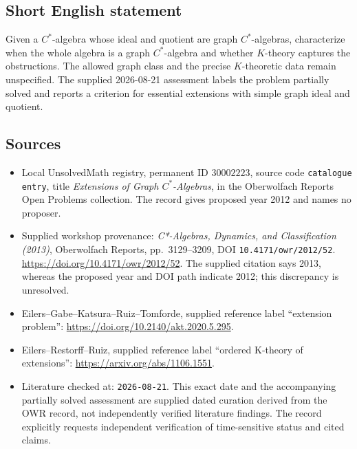 \documentclass[11pt]{article}
\begin{document}
\subsection{Short English statement}
Given a \(C^*\)-algebra whose ideal and quotient are graph \(C^*\)-algebras, characterize when the whole algebra is a graph \(C^*\)-algebra and whether \(K\)-theory captures the obstructions. The allowed graph class and the precise \(K\)-theoretic data remain unspecified. The supplied 2026-08-21 assessment labels the problem partially solved and reports a criterion for essential extensions with simple graph ideal and quotient.
\subsection{Sources}
\begin{itemize}
\item Local UnsolvedMath registry, permanent ID \(30002223\), source code \texttt{catalogue entry}, title \emph{Extensions of Graph \(C^*\)-Algebras}, in the Oberwolfach Reports Open Problems collection. The record gives proposed year 2012 and names no proposer.
\item Supplied workshop provenance: \emph{C*-Algebras, Dynamics, and Classification (2013)}, Oberwolfach Reports, pp.\ 3129--3209, DOI \texttt{10.4171/owr/2012/52}. \url{https://doi.org/10.4171/owr/2012/52}. The supplied citation says 2013, whereas the proposed year and DOI path indicate 2012; this discrepancy is unresolved.
\item Eilers--Gabe--Katsura--Ruiz--Tomforde, supplied reference label ``extension problem'': \url{https://doi.org/10.2140/akt.2020.5.295}.
\item Eilers--Restorff--Ruiz, supplied reference label ``ordered K-theory of extensions'': \url{https://arxiv.org/abs/1106.1551}.
\item Literature checked at: \texttt{2026-08-21}. This exact date and the accompanying partially solved assessment are supplied dated curation derived from the OWR record, not independently verified literature findings. The record explicitly requests independent verification of time-sensitive status and cited claims.
\end{itemize}
\end{document}
